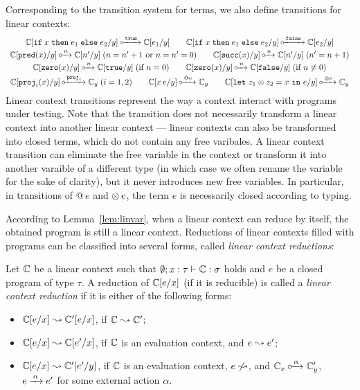 \documentclass[10pt,a4]{article}
\begin{document}
Corresponding to the transition system for terms, we also define transitions for linear contexts:
\[
\begin{array}{c}
\context[\cif{x}{e_1}{e_2}/y] \lintransto{\ctrue} \context[e_1 / y]
\qquad 
\context[\cif{x}{e_1}{e_2}/y] \lintransto{\cfalse} \context[e_2 / y]
\\[0.2em]
\context[\cpred(x)/y] \lintransto{n} \context[n'/y] \; (n = n' + 1  \mbox{ or } n = n' = 0)
\qquad 
\context[\csucc(x)/y] \lintransto{n} \context[n'/y] \; (n' = n + 1) 
\\[0.2em]
\context[\czero(x)/y] \lintransto{n} \context[\ctrue/y] \; (\mbox{if } n = 0) 
\qquad 
\context[\czero(x)/y] \lintransto{n} \context[\cfalse/y] \; (\mbox{if } n \neq 0) 
\\[0.2em]
\context[\cproj_i(x) / y] \lintransto{\cproj_i} \context_y \; (i = 1, 2)
\qquad
\context[x \, e / y] \lintransto{@e} \context_y 
\qquad
\context[\clet{z_1 \tensor z_2}{x}{e}/y] \lintransto{\tensor e} \context_y
\end{array}
\]
%
Linear context transitions represent the way a context interact with programs under testing.
Note that the transition does not necessarily transform a linear context into another linear context ---
linear contexts can also be transformed into closed terms, which do not contain any free varibales.
A linear context transition can eliminate the free variable in the context or transform it into another 
varaible of a different type (in which case we often rename the variable for the sake of clarity), 
but it never introduces new free variables. In particular, in transitions of $@\,e$ and $\otimes\,e$, 
the term $e$ is necessarily closed according to typing. 

According to Lemma~\ref{lem:linvar}, when a linear context can reduce by itself, 
the obtained program is still a linear context.
%
Reductions of linear contexts filled with programs can be classified into several forms, called 
{\em linear context reductions}:
%
\begin{definition}
Let $\mathbb{C}$ be a linear context such that $\emptyset; x :\tau \vdash \mathbb{C}: \sigma$ holds and 
$e$ be a closed program of type $\tau$. 
A reduction of $\mathbb{C}[e / x]$ (if it is reducible) is called a {\em linear context reduction} 
if it is either of the following forms: 
\begin{itemize}
\item $\mathbb{C} [e / x] \leadsto \mathbb{C}' [e / x]$, if $\mathbb{C} \leadsto \mathbb{C}'$;
\item $\mathbb{C} [e / x] \leadsto \mathbb{C} [e' / x]$, if $\mathbb{C}$ is an evaluation context, 
  and $e \leadsto e'$;
\item $\mathbb{C} [e / x] \leadsto \mathbb{C}' [e' / y]$, if $\mathbb{C}$ is an evaluation context,
  $e \not \leadsto$, and $\mathbb{C}_x \,\circ\hspace{-0.5em}\xrightarrow{\,{\alpha}\,} \mathbb{C}_y'$, $e \xrightarrow{\,{\alpha}\,} e'$ 
  for some external action $\alpha$.
\end{itemize}
\end{definition}
\end{document}
